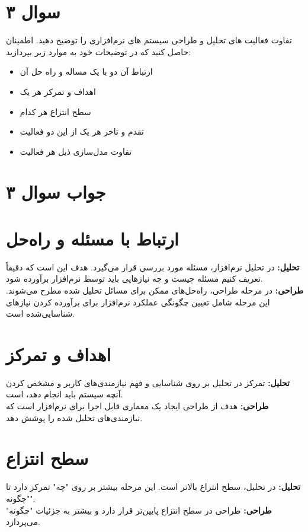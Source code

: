 \section*{سوال ۳}

تفاوت فعالیت های تحلیل و طراحی سیستم های نرم‌افزاری را توضیح دهید. اطمینان حاصل کنید که در توضیحات خود به موارد زیر بپردازید:

\begin{itemize}
	\item ارتباط آن دو با یک مساله و راه حل آن
	\item اهداف و تمرکز هر یک
	\item سطح انتزاع هر کدام
	\item تقدم و تاخر هر یک از این دو فعالیت
	\item تفاوت مدل‌سازی ذیل هر فعالیت
\end{itemize}

\section*{جواب سوال ۳}

\section*{ارتباط با مسئله و راه‌حل}
\textbf{تحلیل:} در تحلیل نرم‌افزار، مسئله مورد بررسی قرار می‌گیرد. هدف این است که دقیقاً تعریف کنیم مسئله چیست و چه نیازهایی باید توسط نرم‌افزار برآورده شود. \\
\textbf{طراحی:} در مرحله طراحی، راه‌حل‌های ممکن برای مسائل تحلیل شده مطرح می‌شوند. این مرحله شامل تعیین چگونگی عملکرد نرم‌افزار برای برآورده کردن نیازهای شناسایی‌شده است.

\section*{اهداف و تمرکز}
\textbf{تحلیل:} تمرکز در تحلیل بر روی شناسایی و فهم نیازمندی‌های کاربر و مشخص کردن آنچه سیستم باید انجام دهد، است. \\
\textbf{طراحی:} هدف از طراحی ایجاد یک معماری قابل اجرا برای نرم‌افزار است که نیازمندی‌های تحلیل شده را پوشش دهد.

\section*{سطح انتزاع}
\textbf{تحلیل:} در تحلیل، سطح انتزاع بالاتر است. این مرحله بیشتر بر روی "چه" تمرکز دارد تا "چگونه". \\
\textbf{طراحی:} طراحی در سطح انتزاع پایین‌تر قرار دارد و بیشتر به جزئیات "چگونه" می‌پردازد.

